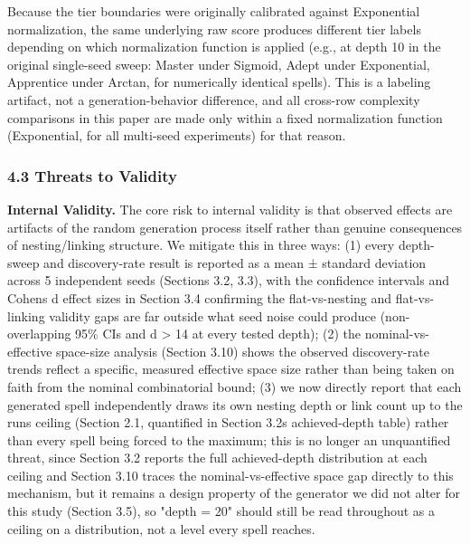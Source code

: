 \documentclass[
  10pt,
  twocolumn]{article}
\begin{document}
Because the tier boundaries were originally calibrated against
Exponential normalization, the same underlying raw score produces
different tier labels depending on which normalization function is
applied (e.g., at depth 10 in the original single-seed sweep: Master
under Sigmoid, Adept under Exponential, Apprentice under Arctan, for
numerically identical spells). This is a labeling artifact, not a
generation-behavior difference, and all cross-row complexity comparisons
in this paper are made only within a fixed normalization function
(Exponential, for all multi-seed experiments) for that reason.

\subsubsection{4.3 Threats to Validity}\label{43-threats-to-validity}

\textbf{Internal Validity.} The core risk to internal validity is that
observed effects are artifacts of the random generation process itself
rather than genuine consequences of nesting/linking structure. We
mitigate this in three ways: (1) every depth-sweep and discovery-rate
result is reported as a mean ± standard deviation across 5 independent
seeds (Sections 3.2, 3.3), with the confidence intervals and
Cohen\textquotesingle s d effect sizes in Section 3.4 confirming the
flat-vs-nesting and flat-vs-linking validity gaps are far outside what
seed noise could produce (non-overlapping 95\% CIs and
\textbar d\textbar{} \textgreater{} 14 at every tested depth); (2) the
nominal-vs-effective space-size analysis (Section 3.10) shows the
observed discovery-rate trends reflect a specific, measured effective
space size rather than being taken on faith from the nominal
combinatorial bound; (3) we now directly report that each generated
spell independently draws its own nesting depth or link count up to the
run\textquotesingle s ceiling (Section 2.1, quantified in Section
3.2\textquotesingle s achieved-depth table) rather than every spell
being forced to the maximum; this is no longer an unquantified threat,
since Section 3.2 reports the full achieved-depth distribution at each
ceiling and Section 3.10 traces the nominal-vs-effective space gap
directly to this mechanism, but it remains a design property of the
generator we did not alter for this study (Section 3.5), so "depth = 20"
should still be read throughout as a ceiling on a distribution, not a
level every spell reaches.
\end{document}
